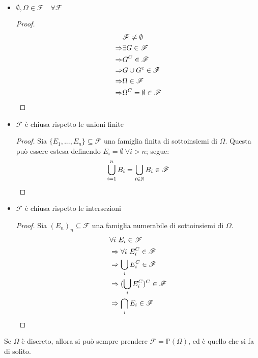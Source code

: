 \documentclass{article}
\theoremstyle{plain}
\theoremstyle{definition}
\theoremstyle{remark}
\begin{document}
\begin{itemize}
	\item $\emptyset,\Omega\in\mathscr{F}\quad\forall\mathscr{F}$
	\begin{proof}
		\begin{align*}
			&\mathscr{F}\neq\emptyset\\
			\Rightarrow&\exists G\in\mathscr{F}\\
			\Rightarrow&G^C\in\mathscr{F}\\
			\Rightarrow&G\cup G^c \in\mathscr{F}\\
			\Rightarrow&\Omega\in\mathscr{F}\\
			\Rightarrow&\Omega^C=\emptyset\in\mathscr{F}\qedhere
		\end{align*}
	\end{proof}
	\item $\mathscr{F}$ è chiusa rispetto le unioni finite
	\begin{proof}
		Sia $\{E_1,...,E_n\}\subseteq\mathscr{F}$ una famiglia finita di sottoinsiemi di $\Omega$. Questa può essere estesa definendo $E_i=\emptyset\ \forall i>n$; segue:
		\begin{equation*}
			\bigcup_{i=1}^n B_i=\bigcup_{i\in\mathbb{N}} B_i\in\mathscr{F}\qedhere
		\end{equation*}
	\end{proof}
	\item $\mathscr{F}$ è chiusa rispetto le intersezioni
	\begin{proof}
		Sia $(E_n)_n\subseteq\mathscr{F}$ una famiglia numerabile di sottoinsiemi di $\Omega$.
		\begin{align*}
			 &\forall i\ E_i\in\mathscr{F}\\
			 &\Rightarrow\forall i\ E_i^C\in\mathscr{F}\\
			 &\Rightarrow\bigcup_i E_i^C\in\mathscr{F}\\
			 &\Rightarrow(\bigcup_i E_i^C)^C\in\mathscr{F}\\
			 &\Rightarrow\bigcap_i E_i\in\mathscr{F}\qedhere
		\end{align*}
	\end{proof}
\end{itemize}
Se $\Omega$ è discreto, allora si può sempre prendere $\mathscr{F}=\mathds{P}(\Omega)$, ed è quello che si fa di solito.
\end{document}

